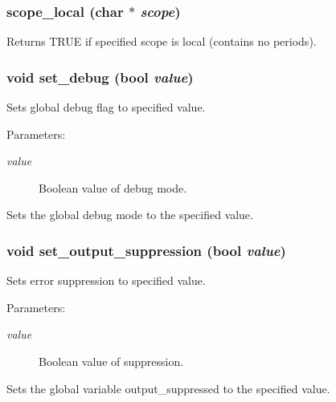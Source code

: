 \subsubsection{ scope\_\-local (char $\ast$ {\em scope})}\label{util_8h_a11}


Returns TRUE if specified scope is local (contains no periods).

\subsubsection{\setlength{\rightskip}{0pt plus 5cm}void set\_\-debug ({\bf bool} {\em value})}\label{util_8h_a1}


Sets global debug flag to specified value.

\begin{Desc}
\item[Parameters: ]\par
\begin{description}
\item[{\em 
value}]Boolean value of debug mode.\end{description}
\end{Desc}
Sets the global debug mode to the specified value. 
\subsubsection{\setlength{\rightskip}{0pt plus 5cm}void set\_\-output\_\-suppression ({\bf bool} {\em value})}\label{util_8h_a0}


Sets error suppression to specified value.

\begin{Desc}
\item[Parameters: ]\par
\begin{description}
\item[{\em 
value}]Boolean value of suppression.\end{description}
\end{Desc}
Sets the global variable output\_\-suppressed to the specified value. 